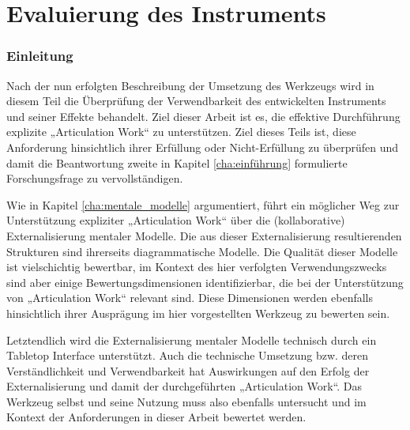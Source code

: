 \part{Evaluierung des Instruments} %
\label{prt:evaluierung}

\section*{Einleitung} %
\label{sec:evaluierung_einleitung}
\thispagestyle{empty}


Nach der nun erfolgten Beschreibung der Umsetzung des Werkzeugs wird in diesem Teil die Überprüfung der Verwendbarkeit des entwickelten Instruments und seiner Effekte behandelt. Ziel dieser Arbeit ist es, die effektive Durchführung explizite „Articulation Work“ zu unterstützen. Ziel dieses Teils ist, diese Anforderung hinsichtlich ihrer Erfüllung oder Nicht-Erfüllung zu überprüfen und damit die Beantwortung zweite in Kapitel \ref{cha:einführung} formulierte Forschungsfrage zu vervollständigen.

Wie in Kapitel \ref{cha:mentale_modelle} argumentiert, führt ein möglicher Weg zur Unterstützung expliziter „Articulation Work“ über die (kollaborative) Externalisierung mentaler Modelle. Die aus dieser Externalisierung resultierenden Strukturen sind ihrerseits diagrammatische Modelle. Die Qualität dieser Modelle ist vielschichtig bewertbar, im Kontext des hier verfolgten Verwendungszwecks sind aber einige Bewertungsdimensionen identifizierbar, die bei der Unterstützung von „Articulation Work“ relevant sind. Diese Dimensionen werden ebenfalls hinsichtlich ihrer Ausprägung im hier vorgestellten Werkzeug zu bewerten sein. 

Letztendlich wird die Externalisierung mentaler Modelle technisch durch ein Tabletop Interface unterstützt. Auch die technische Umsetzung bzw. deren Verständlichkeit und Verwendbarkeit hat Auswirkungen auf den Erfolg der Externalisierung und damit der durchgeführten „Articulation Work“. Das Werkzeug selbst und seine Nutzung muss also ebenfalls untersucht und im Kontext der Anforderungen in dieser Arbeit bewertet werden. 

